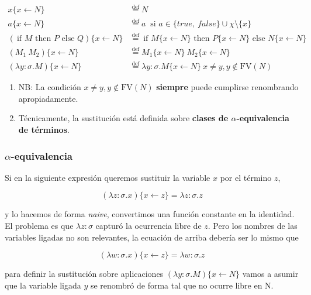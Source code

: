 \documentclass{report}
\theoremstyle{definition} %
\newcommand{\eqdef}{\overset{\text{def}}{=}}
\newcommand{\ifte}[3]{\ \text{if } #1 \text{ then } #2 \text{ else } #3}
\newcommand{\abs}[3]{\lambda #1 : #2 . #3}
\newcommand{\app}[2]{#1 \ #2} %
\newcommand{\sustOne}[3]{#1 \{ #2 \leftarrow #3 \}}
\newcommand{\fv}[1]{\text{FV}(#1)} %
\begin{document}
\begin{align*}
    \sustOne{x}{x}{N} &\eqdef N \\
    \sustOne{a}{x}{N} 
        &\eqdef
        a \ \text{ si } a\in \{true,\ false \} \cup \chi \setminus \{x \} \\
    \sustOne{(\ifte{M}{P}{Q})}{x}{N}
        &\eqdef
        \ifte
            {\sustOne{M}{x}{N}}
            {\sustOne{P}{x}{N}}
            {\sustOne{N}{x}{N}} \\
    \sustOne{(\app{M_1}{M_2})}{x}{N}
        &\eqdef
        \app{\sustOne{M_1}{x}{N}}{\sustOne{M_2}{x}{N}}\\
    \sustOne{(\abs{y}{\sigma}{M})}{x}{N}
        &\eqdef
        \abs{y}{\sigma}{\sustOne{M}{x}{N}} \ x \neq y, y \notin \fv{N}
\end{align*}

\begin{enumerate}
    \item NB: La condición $x\neq y, y \notin \fv{N}$ \textbf{siempre} puede
    cumplirse renombrando apropiadamente.
    \item Técnicamente, la sustitución está definida sobre \textbf{clases de
    $\alpha$-equivalencia de términos}.
\end{enumerate}

\subsubsection{$\alpha$-equivalencia}

Si en la siguiente expresión queremos sustituir la variable $x$ por el término
$z$,

\[
    \sustOne{(\abs{z}{\sigma}{x})}{x}{z} = \abs{z}{\sigma}{z}
\]

y lo hacemos de forma \textit{naive}, convertimos una función constante en la
identidad. El problema es que $\lambda z : \sigma$ capturó la ocurrencia libre
de $z$. Pero los nombres de las variables ligadas no son relevantes, la ecuación
de arriba debería ser lo mismo que

\[
    \sustOne{(\abs{w}{\sigma}{x})}{x}{z} = \abs{w}{\sigma}{z}
\]

para definir la sustitución sobre aplicaciones
$\sustOne{(\abs{y}{\sigma}{M})}{x}{N}$ vamos a asumir que la variable ligada $y$
se renombró de forma tal que no ocurre libre en N.
\end{document}
